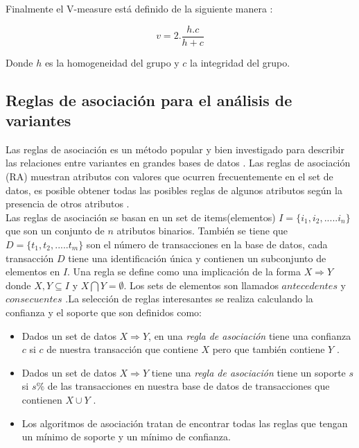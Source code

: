 Finalmente el V-measure está definido de la siguiente manera \cite{Rosenberg2007}:

$$v= 2.\frac{h.c}{h+c}$$

Donde $h$ es la homogeneidad del grupo  y $c$ la integridad del grupo. 

\subsection{Reglas de asociación para el análisis de variantes}

Las reglas de asociación es un método popular y bien investigado para describir las relaciones entre variantes en grandes bases de datos \cite{Hahsler2005}. Las reglas de asociación (RA) muestran atributos con valores que ocurren frecuentemente en el set de datos, es posible obtener todas las posibles reglas de algunos atributos según la presencia de otros atributos \cite{Karabatak2009}.\\

Las reglas de asociación se basan en un set de items(elementos) $I = \{i_1,i_2,.....i_n \}$ que son un conjunto de $n$ atributos binarios. También se tiene que $D = \{t_1,t_2,..... t_m\}$ son el número de transacciones en la base de datos, cada transacción $D$ tiene una identificación única y contienen un subconjunto de elementos en $I$. Una regla se define como una implicación de la forma $X \Rightarrow Y$ donde $X,Y \subseteq I$ y $X \bigcap Y = \emptyset$. Los sets de elementos son llamados $antecedentes$ y $consecuentes$ \cite{Hahsler2005,Karabatak2009}.La selección de reglas interesantes se realiza calculando la confianza y el soporte que son definidos como:

\begin{itemize}
	\item Dados un set de datos $X \Rightarrow Y$, en una \textit{regla de asociación} tiene una confianza $c$ si $c$ de nuestra transacción que contiene $X$ pero que también contiene $Y$ \cite{Agrawal1994}.
	
	\item Dados un set de datos $X \Rightarrow Y$ tiene una \textit{regla de asociación} tiene un soporte $s$ si $s\%$ de las transacciones en nuestra base de datos de transacciones que contienen $X\cup Y$ \cite{Agrawal1994}. 
	
	\item Los algoritmos de asociación tratan de encontrar todas las reglas que tengan un mínimo de soporte y un mínimo de confianza\cite{Agrawal1994}. 
\end{itemize}

